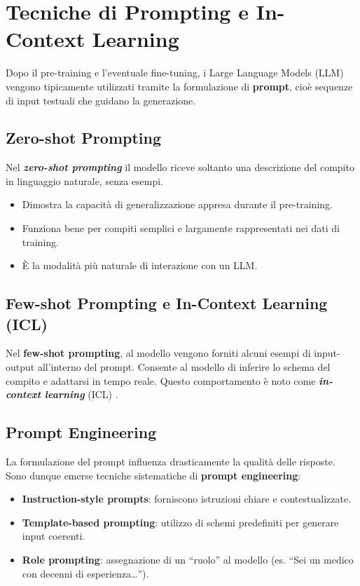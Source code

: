 \clearpage

\section{Tecniche di Prompting e In-Context Learning}

Dopo il pre-training e l'eventuale fine-tuning, i Large Language Models (LLM) 
vengono tipicamente utilizzati tramite la formulazione di \textbf{prompt}, cioè sequenze di input testuali che guidano la generazione.

\subsection{Zero-shot Prompting}
Nel \textbf{\textit{zero-shot prompting}} il modello riceve soltanto una descrizione del compito 
in linguaggio naturale, senza esempi.
\begin{itemize}
    \item Dimostra la capacità di generalizzazione appresa durante il pre-training.
    \item Funziona bene per compiti semplici e largamente rappresentati nei dati di training.
    \item È la modalità più naturale di interazione con un LLM.
\end{itemize}

\subsection{Few-shot Prompting e In-Context Learning (ICL)}
Nel \textbf{few-shot prompting}, al modello vengono forniti alcuni esempi 
di input-output all'interno del prompt. Consente al modello di inferire lo schema del compito e adattarsi in tempo reale.
Questo comportamento è noto come \textbf{\textit{in-context learning}} (ICL) \cite{dong2023survey}.

\subsection{Prompt Engineering}
La formulazione del prompt influenza drasticamente la qualità delle risposte.
Sono dunque emerse tecniche sistematiche di \textbf{prompt engineering}:
\begin{itemize}
    \item \textbf{Instruction-style prompts}: forniscono istruzioni chiare e contestualizzate.
    \item \textbf{Template-based prompting}: utilizzo di schemi predefiniti per generare input coerenti.
    \item \textbf{Role prompting}: assegnazione di un “ruolo” al modello (es. “Sei un medico con decenni di esperienza…”).
\end{itemize}

